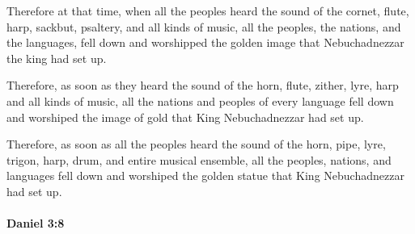 			\begin{versebox}
					\item[BHS] 
					\item[LXX] 
					\item[ASV] Therefore at that time, when all the peoples heard the sound of the cornet, flute, harp, sackbut, psaltery, and all kinds of music, all the peoples, the nations, and the languages, fell down and worshipped the golden image that Nebuchadnezzar the king had set up.
					\item[NIV] Therefore, as soon as they heard the sound of the horn, flute, zither, lyre, harp and all kinds of music, all the nations and peoples of every language fell down and worshiped the image of gold that King Nebuchadnezzar had set up.
					\item[NRSV] Therefore, as soon as all the peoples heard the sound of the horn, pipe, lyre, trigon, harp, drum, and entire musical ensemble, all the peoples, nations, and languages fell down and worshiped the golden statue that King Nebuchadnezzar had set up.
			\end{versebox}

		\paragraph{Daniel 3:8} %
			\label{DANIEL-3-8}

